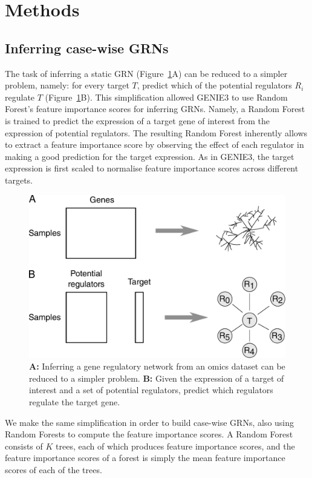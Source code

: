 
\section{Methods}

\subsection{Inferring case-wise GRNs}
The task of inferring a static GRN (Figure~\ref{fig:simplify}A) can be reduced to a simpler problem, namely: for every target $T$, predict which of the potential regulators $R_i$ regulate $T$ (Figure~\ref{fig:simplify}B). This simplification allowed GENIE3\cite{huynh-thu_inferringregulatorynetworks_2010} to use Random Forest's\cite{breiman_randomforests_2001} feature importance scores for inferring GRNs. Namely, a Random Forest is trained to predict the expression of a target gene of interest from the expression of potential regulators. The resulting Random Forest inherently allows to extract a feature importance score by observing the effect of each regulator in making a good prediction for the target expression. As in GENIE3, the target expression is first scaled to normalise feature importance scores across different targets.

\begin{figure}[htb!]
	\centering
	\includegraphics[width=.6\linewidth]{fig/methodology/simplify.pdf} 
	\caption{
		\textbf{A:} Inferring a gene regulatory network from an omics dataset can be reduced to a simpler problem. 
		\textbf{B:} Given the expression of a target of interest and a set of potential regulators, predict which regulators regulate the target gene.
	}
	\label{fig:simplify}
\end{figure}

We make the same simplification in order to build case-wise GRNs, also using Random Forests to compute the feature importance scores. A Random Forest consists of $K$ trees, each of which produces feature importance scores, and the feature importance scores of a forest is simply the mean feature importance scores of each of the trees. 

